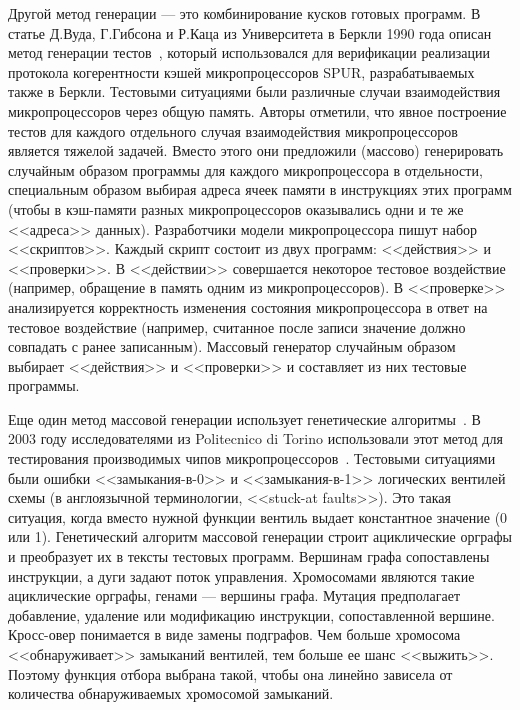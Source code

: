 Другой метод генерации --- это комбинирование кусков готовых программ. В статье Д.Вуда, Г.Гибсона и Р.Каца из Университета в Беркли 1990 года описан метод генерации тестов~\cite{Berkeley89}, который использовался для верификации реализации протокола когерентности кэшей микропроцессоров SPUR, разрабатываемых также в Беркли. Тестовыми ситуациями были различные случаи взаимодействия микропроцессоров через общую память. Авторы отметили, что явное построение тестов для каждого отдельного случая взаимодействия микропроцессоров является тяжелой задачей. Вместо этого они предложили (массово) генерировать случайным образом программы для каждого микропроцессора в отдельности, специальным образом выбирая адреса ячеек памяти в инструкциях этих программ (чтобы в кэш-памяти разных микропроцессоров оказывались одни и те же <<адреса>> данных). Разработчики модели микропроцессора пишут набор <<скриптов>>. Каждый скрипт состоит из двух программ: <<действия>> и <<проверки>>. В <<действии>> совершается некоторое тестовое воздействие (например, обращение в память одним из микропроцессоров). В <<проверке>> анализируется корректность изменения состояния микропроцессора в ответ на тестовое воздействие (например, считанное после записи значение должно совпадать с ранее записанным). Массовый генератор случайным образом выбирает <<действия>> и <<проверки>> и составляет из них тестовые программы.


Еще один метод массовой генерации использует генетические алгоритмы~\cite{GeneticAlgorithms}. В 2003 году исследователями из Politecnico di Torino использовали этот метод для тестирования производимых чипов микропроцессоров~\cite{microGP}. Тестовыми ситуациями были ошибки <<замыкания-в-0>> и <<замыкания-в-1>> логических вентилей схемы (в англоязычной терминологии, <<stuck-at faults>>). Это такая ситуация, когда вместо нужной функции вентиль выдает константное значение (0 или 1). Генетический алгоритм массовой генерации строит ациклические орграфы и преобразует их в тексты тестовых программ. Вершинам графа сопоставлены инструкции, а дуги задают поток управления. Хромосомами являются такие ациклические орграфы, генами --- вершины графа. Мутация предполагает добавление, удаление или модификацию инструкции, сопоставленной вершине. Кросс-овер понимается в виде замены подграфов. Чем больше хромосома <<обнаруживает>> замыканий вентилей, тем больше ее шанс <<выжить>>. Поэтому функция отбора выбрана такой, чтобы она линейно зависела от количества обнаруживаемых хромосомой замыканий.

